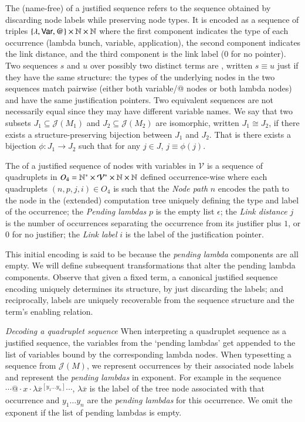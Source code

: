 \documentclass{elsarticle}
\theoremstyle{plain}
\theoremstyle{definition}
\theoremstyle{remark}
\newcommand\VarSet{\mathcal{V}}
\def\justseqset{\mathcal{J}}
\begin{document}
The (name-free)  of a justified sequence refers to the sequence obtained by discarding node labels while preserving node types. It is encoded as a sequence of triples $\{\lambda, {\sf Var}, @ \}\times\mathbb{N}\times\mathbb{N}$ where the first component indicates the type of each occurrence (lambda bunch, variable, application), the second component indicates the link distance, and the third component is the link label ($0$ for no pointer).
Two sequences $s$ and $u$ over possibly two distinct terms are , written $s \equiv u$ just if they have the same structure: the types of the underlying nodes in the two sequences match pairwise (either both variable/@ nodes or both lambda nodes) and have the same justification pointers. Two equivalent sequences are not necessarily equal since they may have different variable names.
We say that two subsets $J_1\subseteq \justseqset(M_1)$ and $J_2\subseteq\justseqset(M_2)$ are isomorphic, written $J_1\cong J_2$, if  there exists a structure-preserving bijection between $J_1$ and $J_2$. That is there exists a bijection $\phi :J_1\longrightarrow J_2$ such that for any $j\in J$, $j\equiv\phi(j)$.

The  of a justified sequence of nodes with variables in $\VarSet$ is a sequence of quadruplets in $O_4 = \mathbb{N}^*\times \mathcal{V}^* \times\mathbb{N}\times\mathbb{N}$ defined occurrence-wise where each quadruplets $(n,p,j,i) \in O_4$ is such that the \emph{Node path} $n$ encodes the path to the node in the (extended) computation tree uniquely defining the type and label of the occurrence;
the \emph{Pending lambdas} $p$ is the empty list $\epsilon$;
the \emph{Link distance} $j$ is the number of occurrences separating the occurrence from its justifier plus $1$, or $0$ for no justifier;
the \emph{Link label} $i$ is the label of the justification pointer.

This initial encoding is said to be  because the \emph{pending lambda} components are all empty. We will define subsequent transformations that alter the pending lambda components.
Observe that given a fixed term, a canonical justified sequence encoding uniquely determines its structure, by just discarding the labels; and reciprocally, labels are uniquely recoverable from the sequence structure and the term's enabling relation.

\emph{Decoding a quadruplet sequence} When interpreting a quadruplet sequence as a justified sequence, the variables from the `pending lambdas' get appended to the list of variables bound by the corresponding lambda nodes. When typesetting a sequence from $\justseqset(M)$, we represent occurrences by their associated node labels and represent the \emph{pending lambdas} in exponent. For example in the sequence $\cdots @ \cdot x \cdot \lambda\overline{x}^{[y_1 \ldots y_n]} \cdots$, $\lambda\overline{x}$ is the label of the tree node associated with that occurrence and $y_1 \ldots y_n$ are the \emph{pending lambdas} for this occurrence. We omit the exponent if the list of pending lambdas is empty.
\end{document}
